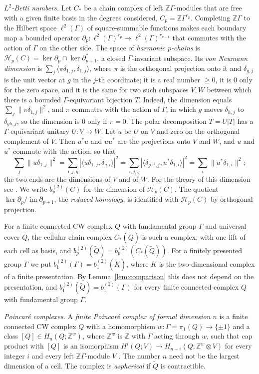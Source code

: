 \documentclass[11pt,a4paper]{article}
\theoremstyle{definition}
\theoremstyle{remark}
\newcommand{\Z}{\mathbb{Z}}
\newcommand{\Gam}{\Gamma}
\newcommand{\lt}{\ell^2}
\newcommand{\bt}[1]{b^{(2)}_{#1}}
\begin{document}
\emph{$L^2$-Betti numbers.} Let $C_*$ be a chain complex of left $\Z\Gam$-modules
that are free with a given finite basis in the degrees considered, $C_p=\Z\Gam^{r_p}$.
Completing $\Z\Gam$ to the Hilbert space $\lt(\Gam)$ of square-summable functions makes
each boundary map a bounded operator
$\partial_p:\lt(\Gam)^{r_p}\to\lt(\Gam)^{r_{p-1}}$ that commutes with the action of $\Gam$
on the other side. The space of \emph{harmonic $p$-chains} is
$\mathcal H_p(C)=\ker\partial_p\cap\ker\partial_{p+1}^*$, a closed $\Gam$-invariant
subspace. Its \emph{von Neumann dimension} is
$\sum_j\langle\pi\delta_{1,j},\delta_{1,j}\rangle$, where $\pi$ is the orthogonal
projection onto it and $\delta_{g,j}$ is the unit vector at $g$ in the
$j$-th coordinate; it is a real number $\ge0$, it is $0$ only for the zero space,
and it is the same for two such subspaces $V,W$ between which there is a bounded
$\Gam$-equivariant bijection $T$. Indeed, the dimension equals
$\sum_j\|\pi\delta_{1,j}\|^2$, and $\pi$ commutes with the action of $\Gam$, in
which $g$ moves $\delta_{h,j}$ to $\delta_{gh,j}$, so the dimension is $0$ only if
$\pi=0$. The polar decomposition $T=U|T|$ has a $\Gam$-equivariant unitary
$U:V\to W$. Let $u$ be $U$ on $V$ and zero on the orthogonal complement of $V$.
Then $u^*u$ and $uu^*$ are the projections onto $V$ and $W$, and $u$ and $u^*$
commute with the action, so that
\[
 \sum_j\|u\delta_{1,j}\|^2=\sum_{i,j,g}|\langle u\delta_{1,j},\delta_{g,i}\rangle|^2
 =\sum_{i,j,g}|\langle\delta_{g^{-1},j},u^*\delta_{1,i}\rangle|^2=\sum_i\|u^*\delta_{1,i}\|^2 ;
\]
the two ends are the dimensions of $V$ and of $W$. For the theory of this
dimension see \cite[Chapter~1]{L}. We write
$\bt{p}(C)$ for the dimension of $\mathcal H_p(C)$. The quotient $\ker\partial_p/\overline{\operatorname{im}
\partial_{p+1}}$, the \emph{reduced homology}, is identified with
$\mathcal H_p(C)$ by orthogonal projection.

For a finite connected CW complex $Q$ with fundamental group $\Gam$ and universal
cover $\widetilde Q$, the cellular chain complex $C_*(\widetilde Q)$ is such a
complex, with one lift of each cell as basis, and
$\bt{p}(\widetilde Q)=\bt{p}(C_*(\widetilde Q))$. For a finitely presented group
$\Gam$ we put $\bt{1}(\Gam)=\bt{1}(\widetilde K)$, where $K$ is the two-dimensional
complex of a finite presentation. By Lemma~\ref{lem:comparison} this does not depend
on the presentation, and $\bt{1}(\widetilde Q)=\bt{1}(\Gam)$ for every finite
connected complex $Q$ with fundamental group $\Gam$.

\emph{Poincar\'e complexes.} A \emph{finite Poincar\'e complex of formal dimension
$n$} is a finite connected CW complex $Q$ with a homomorphism $w:\Gam=\pi_1(Q)\to\{\pm1\}$
and a class $[Q]\in H_n(Q;\Z^w)$, where $\Z^w$ is $\Z$ with $\Gam$ acting through $w$,
such that cap product with $[Q]$ is an isomorphism
$H^i(Q;V)\to H_{n-i}(Q;\Z^w\otimes V)$ for every integer $i$ and every left
$\Z\Gam$-module $V$ \cite{W}. The number $n$ need not be the largest dimension of a
cell. The complex is \emph{aspherical} if $\widetilde Q$ is contractible.
\end{document}
